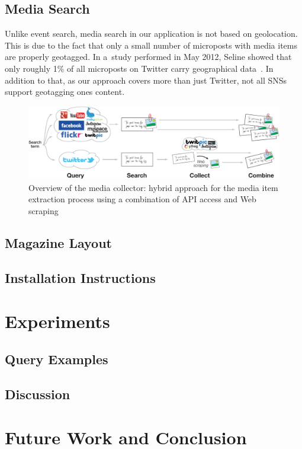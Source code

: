 \documentclass{acm_proc_article-sp}
\begin{document}
\subsection{Media Search}
Unlike event search, media search in our application is not based on geolocation.
This is due to the fact that only a small number of microposts with media items
are properly geotagged.
In a~study performed in May 2012, Seline showed that only roughly 1\% of all microposts
on Twitter carry geographical data~\cite{Quora2012}.
In addition to that, as our approach covers more than just Twitter,
not all SNSs support geotagging ones content.


\begin{figure}
\centering
\includegraphics[width=1.0\linewidth]{./architecture.pdf}
\caption{Overview of the media collector: hybrid approach for the media item extraction process using a combination of API access and Web scraping}
\label{fig:architecture}
\end{figure}

\subsection{Magazine Layout}

\subsection{Installation Instructions}

\section{Experiments}

\subsection{Query Examples}

\subsection{Discussion}

\section{Future Work and Conclusion}






\balancecolumns
\end{document}
